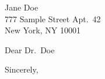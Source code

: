 \documentclass[ucsb,ece,12pt]{ucletter}
\begin{document}
\begin{letter}{
    Jane Doe\\
    777 Sample Street Apt.\ 42\\
    New York, NY 10001
}
\opening{Dear Dr.\ Doe}

\lipsum[1-6]

\closing{Sincerely,}
\end{letter}
\end{document}
